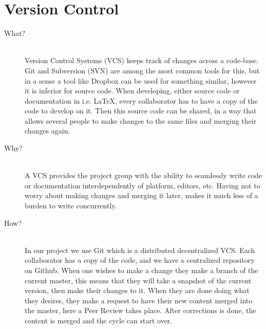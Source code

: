 \section{Version Control}
\label{sec:versioncontrol}
\begin{description}
    \item[What?]\hfill\\
    Version Control Systems (VCS) keeps track of changes across a code-base. 
    Git and Subversion (SVN) are among the most common tools for this, but in a sense a tool like Dropbox can be used for something similar, however it is inferior for source code.
    When developing, either source code or documentation in i.e. LaTeX, every collaborator has to have a copy of the code to develop on it. 
    Then this source code can be shared, in a way that allows several people to make changes to the same files and merging their changes again. 

    \item[Why?]\hfill\\ 
    A VCS provides the project group with the ability to seamlessly write code or documentation interdependently of platform, editors, etc.
    Having not to worry about making changes and merging it later, makes it much less of a burden to write concurrently. 

    \item[How?]\hfill\\
    In our project we use Git which is a distributed decentralized VCS. 
    Each collaborator has a copy of the code, and we have a centralized repository on Github. 
    When one wishes to make a change they make a branch of the current master, this means that they will take a snapshot of the current version, then make their changes to it.
    When they are done doing what they desires, they make a request to have their new content merged into the master, here a Peer Review takes place. 
    After corrections is done, the content is merged and the cycle can start over. 
\end{description}

\pagebreak
